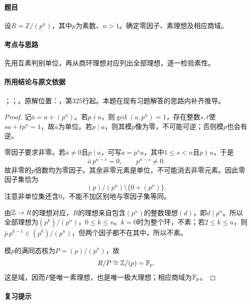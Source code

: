 \label{ex:3:30}

\paragraph{题目}

设$R=\mathbb Z/(p^n)$，其中$p$为素数、$n>1$。确定零因子、素理想及相应商域。

\paragraph{考点与思路}

先用互素判别单位，再从商环理想对应列出全部理想，逐一检验素性。

\paragraph{所用结论与原文依据}

；；。原解位置：，第325行起。本题在现有习题解答的思路内补齐推导。


\begin{proof}

记$\bar a=a+(p^n)$。若$p\nmid a$，则$\gcd(a,p^n)=1$，存在整数$s,t$使$sa+tp^n=1$，故$\bar a$为单位。若$p\mid a$，则其模$p$像为零，不可能可逆；否则模$p$也会有逆。

零因子要求非零。若$\bar a\ne0$且$p\mid a$，可写$a=p^su$，其中$1\le s<n$且$p\nmid u$，于是
\[
\bar a\,\overline{p^{n-s}}=0,\qquad \overline{p^{n-s}}\ne0.
\]
故非零的$p$倍数均为零因子。其余非零元素是单位，不可能消去非零元素。因此零因子集恰为
\[
(p)/(p^n)\setminus\{0+(p^n)\}.
\]
注意非单位集还含$0$，不能不加区别地与零因子集等同。

由$\mathbb Z\to R$的理想对应，$R$的理想来自包含$(p^n)$的整数理想$(d)$，即$d\mid p^n$。所以全部理想为$(p^k)/(p^n)$，$0\le k\le n$。$k=0$时为整个环，不素；若$2\le k\le n$，则$\bar p\,\overline{p^{k-1}}\in(p^k)/(p^n)$，但两个因子都不在其中，所以不素。

模$p$的满同态核为$P=(p)/(p^n)$，故
\[
R/P\cong\mathbb Z/(p)=\mathbb F_p.
\]
这是域，因而$P$是唯一素理想，也是唯一极大理想；相应商域为$\mathbb F_p$。

\end{proof}

\paragraph{复习提示}

